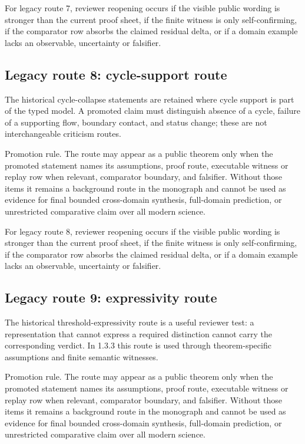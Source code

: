 For legacy route 7, reviewer reopening occurs if the visible public wording is stronger than the current proof sheet, if the finite witness is only self-confirming, if the comparator row absorbs the claimed residual delta, or if a domain example lacks an observable, uncertainty or falsifier.


\subsection{Legacy route 8: cycle-support route}

The historical cycle-collapse statements are retained where cycle support is part of the typed model. A promoted claim must distinguish absence of a cycle, failure of a supporting flow, boundary contact, and status change; these are not interchangeable criticism routes.


Promotion rule. The route may appear as a public theorem only when the promoted statement names its assumptions, proof route, executable witness or replay row when relevant, comparator boundary, and falsifier. Without those items it remains a background route in the monograph and cannot be used as evidence for final bounded cross-domain synthesis, full-domain prediction, or unrestricted comparative claim over all modern science.


For legacy route 8, reviewer reopening occurs if the visible public wording is stronger than the current proof sheet, if the finite witness is only self-confirming, if the comparator row absorbs the claimed residual delta, or if a domain example lacks an observable, uncertainty or falsifier.


\subsection{Legacy route 9: expressivity route}

The historical threshold-expressivity route is a useful reviewer test: a representation that cannot express a required distinction cannot carry the corresponding verdict. In 1.3.3 this route is used through theorem-specific assumptions and finite semantic witnesses.


Promotion rule. The route may appear as a public theorem only when the promoted statement names its assumptions, proof route, executable witness or replay row when relevant, comparator boundary, and falsifier. Without those items it remains a background route in the monograph and cannot be used as evidence for final bounded cross-domain synthesis, full-domain prediction, or unrestricted comparative claim over all modern science.


